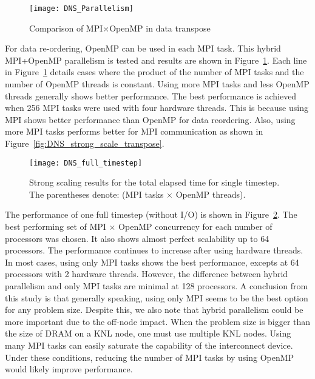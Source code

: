 \begin{figure}
 \begin{center}
   \texttt{[image: DNS\_Parallelism]}
   \caption{Comparison of MPI$\times$OpenMP in data transpose}
   \label{fig:DNS_MPI_OpenMP}
 \end{center}
\end{figure}


For data re-ordering, OpenMP can be used in each MPI task. This hybrid MPI+OpenMP parallelism
is tested and results are shown in Figure~\ref{fig:DNS_MPI_OpenMP}.
Each line in Figure~\ref{fig:DNS_MPI_OpenMP} details cases where the product of
the number of MPI tasks and the number of OpenMP threads is
constant. Using more MPI tasks and less OpenMP threads generally shows
better performance. The best performance is achieved when 256 MPI tasks
were used with four hardware threads. This is because using MPI shows
better performance than OpenMP for data reordering. Also, using more MPI
tasks performs better for MPI communication as shown in
Figure~\ref{fig:DNS_strong_scale_transpose}.


\begin{figure}
 \begin{center}
   \texttt{[image: DNS\_full\_timestep]}
   \caption{Strong scaling results for the total elapsed time for single timestep. The parentheses denote: (MPI tasks $\times$ OpenMP threads).}
   \label{fig:DNS_strong_scale_total_elapsed_time}
 \end{center}
\end{figure}

The performance of one full timestep (without I/O) is shown in
Figure~\ref{fig:DNS_strong_scale_total_elapsed_time}. The best
performing set of MPI $\times$ OpenMP concurrency for each number of
processors was chosen. It also shows almost perfect scalability up to 64
processors. The performance continues to increase after using hardware
threads. In most cases, using only MPI tasks shows the best performance,
excepts at 64 processors with 2 hardware threads. However, the
difference between hybrid parallelism and only MPI tasks are minimal at
128 processors. A conclusion from this study is that generally speaking,
using only MPI seems to be the best option for any problem size.
Despite this, we also note that hybrid parallelism could be more
important due to the off-node impact. When the problem size
is bigger than the size of DRAM on a KNL node, one must use multiple KNL
nodes. Using many MPI tasks can easily saturate the capability of
the interconnect device. Under these conditions, reducing the number of MPI tasks
by using OpenMP would likely improve performance.

